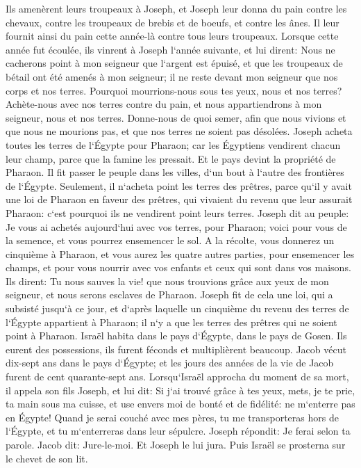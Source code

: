 \verse Ils amenèrent leurs troupeaux à Joseph, et Joseph leur donna du pain contre les chevaux, contre les troupeaux de brebis et de boeufs, et contre les ânes. Il leur fournit ainsi du pain cette année-là contre tous leurs troupeaux. 
\verse Lorsque cette année fut écoulée, ils vinrent à Joseph l`année suivante, et lui dirent: Nous ne cacherons point à mon seigneur que l`argent est épuisé, et que les troupeaux de bétail ont été amenés à mon seigneur; il ne reste devant mon seigneur que nos corps et nos terres. 
\verse Pourquoi mourrions-nous sous tes yeux, nous et nos terres? Achète-nous avec nos terres contre du pain, et nous appartiendrons à mon seigneur, nous et nos terres. Donne-nous de quoi semer, afin que nous vivions et que nous ne mourions pas, et que nos terres ne soient pas désolées. 
\verse Joseph acheta toutes les terres de l`Égypte pour Pharaon; car les Égyptiens vendirent chacun leur champ, parce que la famine les pressait. Et le pays devint la propriété de Pharaon. 
\verse Il fit passer le peuple dans les villes, d`un bout à l`autre des frontières de l`Égypte. 
\verse Seulement, il n`acheta point les terres des prêtres, parce qu`il y avait une loi de Pharaon en faveur des prêtres, qui vivaient du revenu que leur assurait Pharaon: c`est pourquoi ils ne vendirent point leurs terres. 
\verse Joseph dit au peuple: Je vous ai achetés aujourd`hui avec vos terres, pour Pharaon; voici pour vous de la semence, et vous pourrez ensemencer le sol. 
\verse A la récolte, vous donnerez un cinquième à Pharaon, et vous aurez les quatre autres parties, pour ensemencer les champs, et pour vous nourrir avec vos enfants et ceux qui sont dans vos maisons. 
\verse Ils dirent: Tu nous sauves la vie! que nous trouvions grâce aux yeux de mon seigneur, et nous serons esclaves de Pharaon. 
\verse Joseph fit de cela une loi, qui a subsisté jusqu`à ce jour, et d`après laquelle un cinquième du revenu des terres de l`Égypte appartient à Pharaon; il n`y a que les terres des prêtres qui ne soient point à Pharaon. 
\verse Israël habita dans le pays d`Égypte, dans le pays de Gosen. Ils eurent des possessions, ils furent féconds et multiplièrent beaucoup. 
\verse Jacob vécut dix-sept ans dans le pays d`Égypte; et les jours des années de la vie de Jacob furent de cent quarante-sept ans. 
\verse Lorsqu`Israël approcha du moment de sa mort, il appela son fils Joseph, et lui dit: Si j`ai trouvé grâce à tes yeux, mets, je te prie, ta main sous ma cuisse, et use envers moi de bonté et de fidélité: ne m`enterre pas en Égypte! 
\verse Quand je serai couché avec mes pères, tu me transporteras hors de l`Égypte, et tu m`enterreras dans leur sépulcre. Joseph répondit: Je ferai selon ta parole. 
\verse Jacob dit: Jure-le-moi. Et Joseph le lui jura. Puis Israël se prosterna sur le chevet de son lit. 

